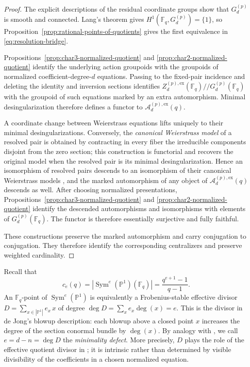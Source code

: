 \documentclass[a4paper,12pt]{amsart}
\theoremstyle{definition}
\newcommand{\Fb}{\mathbb{F}}
\newcommand{\Ac}{\mathcal{A}}
\newcommand{\Pb}{\mathbb{P}}
\newcommand{\Sym}{\operatorname{Sym}}
\begin{document}
\begin{proof}
The explicit descriptions of the residual coordinate groups show that $G_d^{(p)}$ is smooth and connected.  Lang's theorem gives $H^1(\Fb_q,G_d^{(p)})=\{1\}$, so Proposition~\ref{prop:rational-points-of-quotients} gives the first equivalence in \eqref{eq:resolution-bridge}.

Propositions~\ref{prop:char3-normalized-quotient} and \ref{prop:char2-normalized-quotient} identify the underlying action groupoids with the groupoids of normalized coefficient-degree-$d$ equations.  Passing to the fixed-pair incidence and deleting the identity and inversion sections identifies $Z_d^{(p),\mathrm{ex}}(\Fb_q)\mathbin{//}G_d^{(p)}(\Fb_q)$ with the groupoid of such equations marked by an extra automorphism.  Minimal desingularization therefore defines a functor to $\Ac_d^{(p),\mathrm{ex}}(q)$.

A coordinate change between Weierstrass equations lifts uniquely to their minimal desingularizations.  Conversely, the \emph{canonical Weierstrass model} of a resolved pair is obtained by contracting in every fiber the irreducible components disjoint from the zero section; this construction is functorial and recovers the original model when the resolved pair is its minimal desingularization.  Hence an isomorphism of resolved pairs descends to an isomorphism of their canonical Weierstrass models \cite[Sections~4.7--4.9]{dJ2}, and the marked automorphism of any object of $\Ac_d^{(p),\mathrm{ex}}(q)$ descends as well.  After choosing normalized presentations, Propositions~\ref{prop:char3-normalized-quotient} and \ref{prop:char2-normalized-quotient} identify the descended automorphisms and isomorphisms with elements of $G_d^{(p)}(\Fb_q)$.  The functor is therefore essentially surjective and fully faithful.

These constructions preserve the marked automorphism and carry conjugation to conjugation.  They therefore identify the corresponding centralizers and preserve weighted cardinality.
\end{proof}

Recall that
\[
c_e(q)=|\Sym^e(\Pb^1)(\Fb_q)|=\frac{q^{e+1}-1}{q-1}.
\]
An $\Fb_q$-point of $\Sym^e(\Pb^1)$ is equivalently a Frobenius-stable effective divisor $D=\sum_{x\in|\Pb^1|}e_x\,x$ of degree $\deg D=\sum_xe_x\deg(x)=e$.  This is the divisor in de Jong's blowup description: each blowup above a closed point $x$ increases the degree of the section conormal bundle by $\deg(x)$.  By analogy with \cite[Definition~4.31]{BPS}, we call $e=d-n=\deg D$ the \emph{minimality defect}.  More precisely, $D$ plays the role of the effective quotient divisor in \cite[Lemma~4.32]{BPS}; it is intrinsic rather than determined by visible divisibility of the coefficients in a chosen normalized equation.
\end{document}
